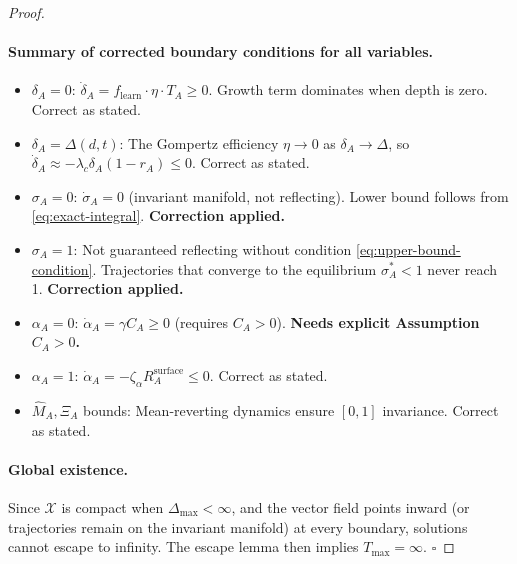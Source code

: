 \begin{proof}
\paragraph{Summary of corrected boundary conditions for all variables.}
\begin{itemize}[nosep]
\item $\delta_A = 0$: $\dot{\delta}_A = f_{\text{learn}} \cdot \eta \cdot T_A \geq 0$.
  Growth term dominates when depth is zero. Correct as stated.
\item $\delta_A = \Delta(d,t)$: The Gompertz efficiency $\eta \to 0$ as
  $\delta_A \to \Delta$, so $\dot{\delta}_A \approx -\lambda_c \delta_A (1 - r_A) \leq 0$.
  Correct as stated.
\item $\sigma_A = 0$: $\dot{\sigma}_A = 0$ (invariant manifold, not
  reflecting). Lower bound follows from \eqref{eq:exact-integral}.
  \textbf{Correction applied.}
\item $\sigma_A = 1$: Not guaranteed reflecting without condition
  \eqref{eq:upper-bound-condition}. Trajectories that converge to the
  equilibrium $\sigma_A^* < 1$ never reach 1. \textbf{Correction applied.}
\item $\alpha_A = 0$: $\dot{\alpha}_A = \gamma C_A \geq 0$ (requires $C_A > 0$).
  \textbf{Needs explicit Assumption $C_A > 0$.}
\item $\alpha_A = 1$: $\dot{\alpha}_A = -\zeta_\alpha R_A^{\text{surface}} \leq 0$.
  Correct as stated.
\item $\hat{M}_A, \Xi_A$ bounds: Mean-reverting dynamics ensure $[0,1]$
  invariance. Correct as stated.
\end{itemize}

\paragraph{Global existence.}
Since $\mathcal{X}$ is compact when $\Delta_{\max} < \infty$, and the
vector field points inward (or trajectories remain on the invariant
manifold) at every boundary, solutions cannot escape to infinity.
The escape lemma then implies $T_{\max} = \infty$. $\square$
\end{proof}

